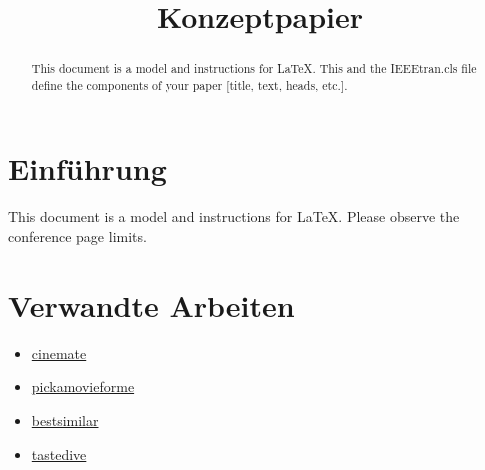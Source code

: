 \documentclass[conference]{IEEEtran}
\begin{document}
\title{Konzeptpapier}

\author{
	\and

	\and
	
	\and
	
	\and
	
	\and
	
}

\maketitle

\begin{abstract}
This document is a model and instructions for \LaTeX.
This and the IEEEtran.cls file define the components of your paper [title, text, heads, etc.].
\end{abstract}


\section{Einführung}

This document is a model and instructions for \LaTeX.
Please observe the conference page limits.




\section{Verwandte Arbeiten}

\begin{itemize}
	\item \href{https://cinemate.me/}{cinemate}
	\item \href{https://pickamovieforme.com/}{pickamovieforme}
	\item \href{https://bestsimilar.com/}{bestsimilar}
	\item \href{https://tastedive.com/movies}{tastedive}
\end{itemize}
\end{document}
